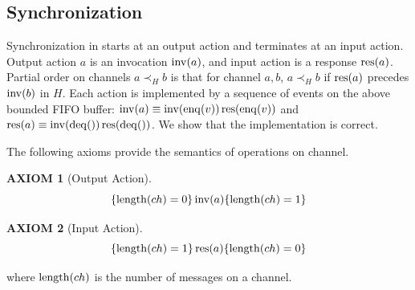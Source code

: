 \documentclass[12pt,a4paper,titlepage]{article}
\theoremstyle{break}
\newtheorem{axiom}{AXIOM}[section]
\begin{document}
\subsection{Synchronization}
Synchronization in \NHK starts at an output action and terminates at an input action.
Output action $a$ is an invocation \(\mathop{\mathrm{inv}}\nolimits(a)\), and input action is a response \(\mathop{\mathrm{res}}\nolimits(a)\).
Partial order on channels \(a\prec_H b\) is that for channel \(a, b\), \(a\prec_H b\) if \(\mathop{\mathrm{res}}\nolimits(a)\) precedes \(\mathop{\mathrm{inv}}\nolimits(b)\) in $H$.
Each action is implemented by a sequence of events on the above bounded FIFO buffer: \(\mathop{\mathrm{inv}}\nolimits(a)\equiv\mathop{\mathrm{inv}}\nolimits(\mathop{\mathrm{enq}}\nolimits(v))\mathop{\mathrm{res}}\nolimits(\mathop{\mathrm{enq}}\nolimits(v))\) and \(\mathop{\mathrm{res}}\nolimits(a)\equiv\mathop{\mathrm{inv}}\nolimits(\mathop{\mathrm{deq}}\nolimits())\mathop{\mathrm{res}}\nolimits(\mathop{\mathrm{deq}}\nolimits())\).
We show that the implementation is correct.

The following axioms provide the semantics of operations on channel.
  \begin{axiom}[Output Action]\label{ax:output}
    \begin{displaymath}
\{\mathop{\mathrm{length}}\nolimits(ch)=0\}\mathop{\mathrm{inv}}\nolimits(a)\{\mathop{\mathrm{length}}\nolimits(ch)=1\}
    \end{displaymath}
  \end{axiom}
  \begin{axiom}[Input Action]\label{ax:input}
    \begin{displaymath}
\{\mathop{\mathrm{length}}\nolimits(ch)=1\}\mathop{\mathrm{res}}\nolimits(a)\{\mathop{\mathrm{length}}\nolimits(ch)=0\}
    \end{displaymath}
  \end{axiom}
where \(\mathop{\mathrm{length}}\nolimits(ch)\) is the number of messages on a channel.
\end{document}
